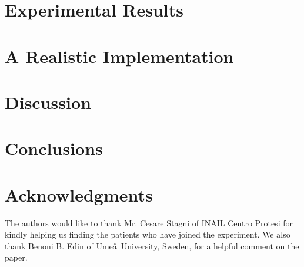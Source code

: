 \documentclass[journal]{IEEEtran}
\begin{document}
\section{Experimental Results}
\label{sec:exp}


\section{A Realistic Implementation}
\label{sec:impl}


\section{Discussion}
\label{sec:disc}


\section{Conclusions}
\label{sec:concl}


\section*{Acknowledgments}

The authors would like to thank Mr. Cesare Stagni of INAIL Centro
Protesi for kindly helping us finding the patients who have joined the
experiment. We also thank Benoni B. Edin of Ume\aa\ University,
Sweden, for a helpful comment on the paper.







\end{document}

